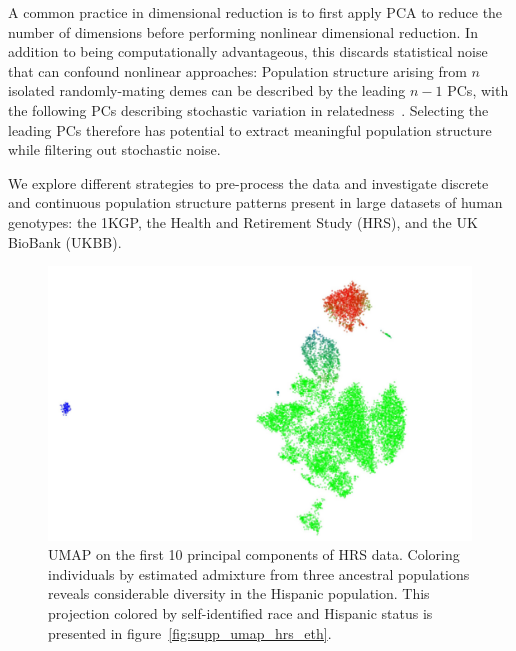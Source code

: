 \documentclass[12pt]{pnas-new}
\begin{document}
A common practice in dimensional reduction is to first apply PCA to reduce the number of dimensions before performing nonlinear dimensional reduction. In addition to being computationally advantageous, this discards statistical noise that can confound nonlinear approaches: Population structure arising from $n$ isolated randomly-mating demes can be described by the leading $n-1$ PCs, with the following PCs describing stochastic variation in relatedness~\cite{eigen2006}. Selecting the leading PCs therefore has potential to extract meaningful population structure while filtering out stochastic noise.

We explore different strategies to pre-process the data and investigate discrete and continuous population structure patterns present in large datasets of human genotypes: the 1KGP, the Health and Retirement Study (HRS)\cite{juster1995overview}, and the UK BioBank (UKBB)\cite{sudlow2015uk}.  

\begin{figure}
\centering
   \includegraphics[width=0.6\linewidth]{images/HRS_1000G_NP1_UMAP_PC10_NC2_NN15_MD05_pca_1kgp_onto_hrs_umap_1kgp_onto_hrs_2018112221116_admix.pdf}
   \caption{UMAP on the first 10 principal components of HRS data. Coloring individuals by estimated admixture from three ancestral populations reveals considerable diversity in the Hispanic population. This projection colored by self-identified race and Hispanic status is presented in figure~\ref{fig:supp_umap_hrs_eth}.}
    \label{fig:umap_hrs_admix}
\end{figure}
\end{document}
